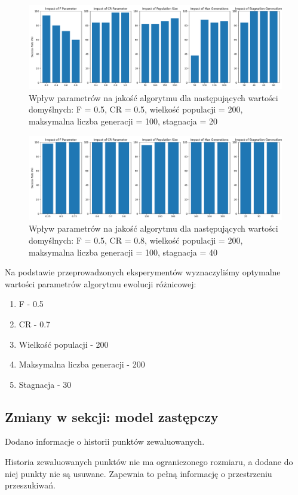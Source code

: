 \documentclass{article}
\begin{document}
\begin{figure}[H]
    \centering
    \includegraphics[width=\textwidth]{parameter_tuning_results_separate3.png}
    \caption{Wpływ parametrów na jakość algorytmu dla następujących wartości domyślnych: F = 0.5, CR = 0.5, wielkość populacji = 200, maksymalna liczba generacji = 100, stagnacja = 20}
    \label{fig:parameter_results3}
\end{figure}

\begin{figure}[H]
    \centering
    \includegraphics[width=\textwidth]{parameter_tuning_results_separate4.png}
    \caption{Wpływ parametrów na jakość algorytmu dla następujących wartości domyślnych: F = 0.5, CR = 0.8, wielkość populacji = 200, maksymalna liczba generacji = 100, stagnacja = 40}
    \label{fig:parameter_results4}
\end{figure}

Na podstawie przeprowadzonych eksperymentów wyznaczyliśmy optymalne wartości parametrów algorytmu ewolucji różnicowej:
\begin{enumerate}
    \item F - 0.5
    \item CR - 0.7
    \item Wielkość populacji - 200
    \item Maksymalna liczba generacji - 200
    \item Stagnacja - 30
\end{enumerate}

\subsection{Zmiany w sekcji: model zastępczy}

Dodano informacje o historii punktów zewaluowanych.

Historia zewaluowanych punktów nie ma ograniczonego rozmiaru, a dodane do niej punkty nie są usuwane. Zapewnia to pełną informację o przestrzeniu przeszukiwań.
\end{document}
